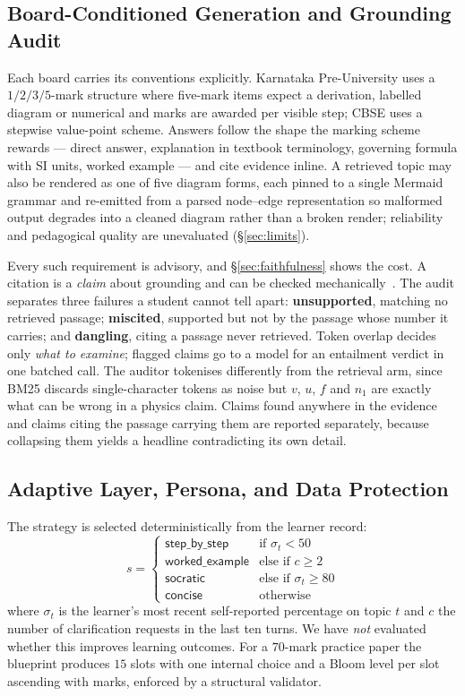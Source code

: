 \documentclass[conference]{IEEEtran}
\begin{document}
\subsection{Board-Conditioned Generation and Grounding Audit}
\label{sec:audit}
Each board carries its conventions explicitly. Karnataka Pre-University uses a
$1/2/3/5$-mark structure where five-mark items expect a derivation, labelled
diagram or numerical and marks are awarded per visible step; CBSE uses a
stepwise value-point scheme. Answers follow the shape the marking scheme rewards
--- direct answer, explanation in textbook terminology, governing formula with
SI units, worked example --- and cite evidence inline. A retrieved topic may
also be rendered as one of five diagram forms, each pinned to a single Mermaid
grammar and re-emitted from a parsed node--edge representation so malformed
output degrades into a cleaned diagram rather than a broken render; reliability
and pedagogical quality are unevaluated (§\ref{sec:limits}).

Every such requirement is advisory, and §\ref{sec:faithfulness} shows the cost.
A citation is a \emph{claim} about grounding and can be checked
mechanically~\cite{manakul2023,gao2023}. The audit separates three failures a
student cannot tell apart: \textbf{unsupported}, matching no retrieved passage;
\textbf{miscited}, supported but not by the passage whose number it carries; and
\textbf{dangling}, citing a passage never retrieved. Token overlap decides only
\emph{what to examine}; flagged claims go to a model for an entailment verdict
in one batched call. The auditor tokenises differently from the retrieval arm,
since BM25 discards single-character tokens as noise but $v$, $u$, $f$ and $n_1$
are exactly what can be wrong in a physics claim. Claims found anywhere in the
evidence and claims citing the passage carrying them are reported separately,
because collapsing them yields a headline contradicting its own detail.

\subsection{Adaptive Layer, Persona, and Data Protection}
\label{sec:adaptive}
The strategy is selected deterministically from the learner record:
\begin{equation}
s =
\begin{cases}
\textsf{step\_by\_step} & \text{if } \sigma_t < 50\\
\textsf{worked\_example} & \text{else if } c \geq 2\\
\textsf{socratic} & \text{else if } \sigma_t \geq 80\\
\textsf{concise} & \text{otherwise}
\end{cases}
\end{equation}
where $\sigma_t$ is the learner's most recent self-reported percentage on topic
$t$ and $c$ the number of clarification requests in the last ten turns. We have
\emph{not} evaluated whether this improves learning outcomes. For a $70$-mark
practice paper the blueprint produces $15$ slots with one internal choice and a
Bloom level per slot ascending with marks, enforced by a structural validator.
\end{document}

